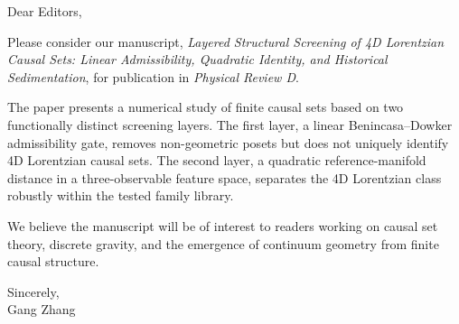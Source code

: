 \documentclass[12pt]{article}
\begin{document}
\noindent
Dear Editors,

\vspace{1em}

Please consider our manuscript, \emph{Layered Structural Screening of 4D
Lorentzian Causal Sets: Linear Admissibility, Quadratic Identity, and
Historical Sedimentation}, for publication in \emph{Physical Review D}.

The paper presents a numerical study of finite causal sets based on two
functionally distinct screening layers. The first layer, a linear
Benincasa--Dowker admissibility gate, removes non-geometric posets but does not
uniquely identify 4D Lorentzian causal sets. The second layer, a quadratic
reference-manifold distance in a three-observable feature space, separates the
4D Lorentzian class robustly within the tested family library.

We believe the manuscript will be of interest to readers working on causal set
theory, discrete gravity, and the emergence of continuum geometry from finite
causal structure.

\vspace{1em}

\noindent
Sincerely,\\
Gang Zhang
\end{document}
